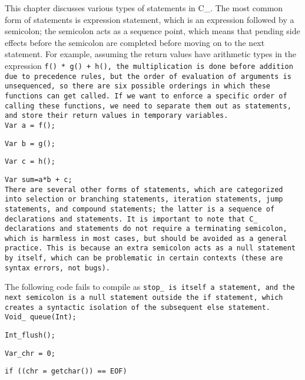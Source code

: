 \def\Section#1{\section{#1}}

This chapter discusses various types of statements in C\_.
The most common form of statements is expression statement,
which is an expression followed by a semicolon;
the semicolon acts as a sequence point, which means that pending side effects
before the semicolon are completed before moving on to the next statement.
For example, assuming the return values have arithmetic types in the expression
\tt{f() * g() + h()}, the multiplication is done before addition due to
precedence rules, but the order of evaluation of arguments is unsequenced,
so there are six possible orderings in which these functions can get called.
If we want to enforce a specific order of calling these functions,
we need to separate them out as statements,
and store their return values in temporary variables.\\

\tt{Var a = f();}

\tt{Var b = g();}

\tt{Var c = h();}

\tt{Var sum}\s\s\tt{=}\s\s\tt{a*b + c;}\\

There are several other forms of statements, which are categorized into
selection or branching statements, iteration statements, jump statements, and
compound statements; the latter is a sequence of declarations and statements.
It is important to note that C\_ declarations and statements do not
require a terminating semicolon, which is harmless in most cases,
but should be avoided as a general practice.
This is because an extra semicolon acts as a null statement by itself, which
can be problematic in certain contexts (these are syntax errors, not bugs).

\example The following code fails to compile as \tt{stop_} is itself a statement,
and the next semicolon is a null statement outside the \tt{if}  statement,
which creates a syntactic isolation of the subsequent \tt{else} statement.\\

\tt{Void_ queue(Int);}

\tt{Int_}\s\s\tt{flush();}

\tt{Var_}\s\s\tt{chr = 0;}

\tt{if ((chr = getchar()) == EOF)}


